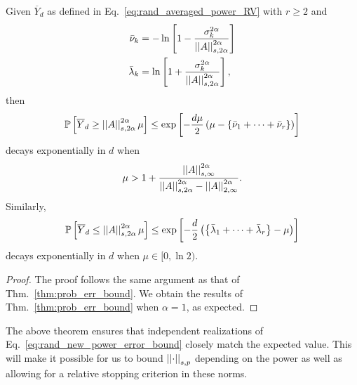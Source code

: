 \begin{thm}
\label{thm:prob_err_bound_power}
Given $\overline{Y}_{d}$ as defined in Eq.~\eqref{eq:rand_averaged_power_RV}
with $r\ge2$ and
%
\begin{align}
    \bar{\nu}_{k} &= -\ln\left[ 1-\frac{\sigma_{k}^{2\alpha}}{
        \left| \left| A \right| \right|_{s,2\alpha}^{2\alpha}} \right]
        \nonumber\\
    \bar{\lambda}_{k} &= \ln\left[ 1+\frac{\sigma_{k}^{2\alpha}}{
        \left| \left| A \right| \right|_{s,2\alpha}^{2\alpha}} \right],
\end{align}
%
then
%
\begin{equation}
    \mathbb{P}\left[ \overline{Y}_{d}\ge \left| \left| A \right| \right|_{s,2\alpha}^{2\alpha}\mu \right]
        \le \exp\left[ -\frac{d\mu}{2}\left( 
            \mu-\left\{ \bar{\nu}_{1}+\cdots+\bar{\nu}_{r} \right\} \right) \right]
\end{equation}
%
decays exponentially in $d$ when
%
\begin{equation}
    \mu > 1 + \frac{\left| \left| A \right| \right|_{s,\infty}^{2\alpha}}{
        \left| \left| A \right| \right|_{s,2\alpha}^{2\alpha} - \left| \left| A \right| \right|_{2,\infty}^{2\alpha}}.
\end{equation}
%
Similarly,
\begin{equation}
    \mathbb{P}\left[ \overline{Y}_{d}\le \left| \left| A \right| \right|_{s,2\alpha}^{2\alpha}\mu \right]
        \le \exp\left[ -\frac{d}{2}\left( 
            \left\{ \bar{\lambda}_{1}+\cdots+\bar{\lambda}_{r} \right\}-\mu \right) \right]
\end{equation}
%
decays exponentially in $d$ when $\mu\in[0,\ln2)$.
\end{thm}

\begin{proof}
The proof follows the same argument as that of 
Thm.~\ref{thm:prob_err_bound}.
We obtain the results of Thm.~\ref{thm:prob_err_bound}
when $\alpha=1$, as expected.
\end{proof}

The above theorem ensures that independent realizations
of Eq.~\eqref{eq:rand_new_power_error_bound} closely
match the expected value.
This will make it possible for us to bound $\left| \left| \cdot \right| \right|_{s,p}$
depending on the power as well as allowing for a relative
stopping criterion in these norms.



